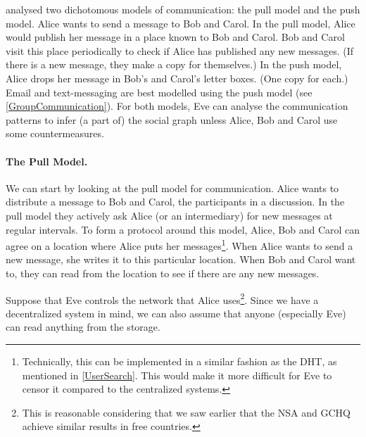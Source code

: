 \textcite{PPACinPubFS} analysed two dichotomous models of communication: the 
pull model and the push model.
Alice wants to send a message to Bob and Carol.
In the pull model, Alice would publish her message in a place known to Bob and 
Carol.
Bob and Carol visit this place periodically to check if Alice has published 
any new messages.
(If there is a new message, they make a copy for themselves.)
In the push model, Alice drops her message in Bob's and Carol's letter boxes.
(One copy for each.)
Email and text-messaging are best modelled using the push model (see 
\cref{GroupCommunication}).
For both models, Eve can analyse the communication patterns to infer (a part 
of) the social graph unless Alice, Bob and Carol use some countermeasures.

\paragraph{The Pull Model.}

We can start by looking at the pull model for communication.
Alice wants to distribute a message to Bob and Carol, the participants in 
a discussion.
In the pull model they actively ask Alice (or an intermediary) for new messages 
at regular intervals.
To form a protocol around this model, Alice, Bob and Carol can agree on 
a location where Alice puts her messages\footnote{%
  Technically, this can be implemented in a similar fashion as the \ac{DHT}, as 
  mentioned in \cref{UserSearch}.
  This would make it more difficult for Eve to censor it compared to the 
  centralized systems.
}.
When Alice wants to send a new message, she writes it to this particular 
location.
When Bob and Carol want to, they can read from the location to see if there are 
any new messages.

Suppose that Eve controls the network that Alice uses\footnote{%
  This is reasonable considering that we saw earlier that the \ac{NSA} and 
  \ac{GCHQ} achieve similar results in free countries.
}.
Since we have a decentralized system in mind, we can also assume that anyone 
(especially Eve) can read anything from the storage.

